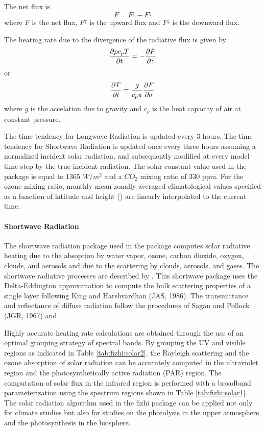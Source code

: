 The net flux is
\[
F = F^\uparrow - F^\downarrow
\]
where $F$ is the net flux, $F^\uparrow$ is the upward flux and $F^\downarrow$ is
the downward flux.

The heating rate due to the divergence of the radiative flux is given by
\[
\frac{\partial \rho c_p T}{\partial t} = - \frac{\partial F}{\partial z}
\]
or
\[
\frac{\partial T}{\partial t} = \frac{g}{c_p \pi} \frac{\partial F}{\partial \sigma}
\]
where $g$ is the accelation due to gravity
and $c_p$ is the heat capacity of air at constant pressure.
  
The time tendency for Longwave
Radiation is updated every 3 hours.  The time tendency for Shortwave Radiation is updated once
every three hours assuming a normalized incident solar radiation, and subsequently modified at
every model time step by the true incident radiation.  
The solar constant value used in the package is equal to 1365 $W/m^2$
and a $CO_2$ mixing ratio of 330 ppm. 
For the ozone mixing ratio, monthly mean zonally averaged 
climatological values specified as a function
of latitude and height (\cite{rosen:87}) are linearly interpolated to the current time.


\paragraph{Shortwave Radiation}

The shortwave radiation package used in the package computes solar radiative 
heating due to the absoption by water vapor, ozone, carbon dioxide, oxygen,
clouds, and aerosols and due to the
scattering by clouds, aerosols, and gases.
The shortwave radiative processes are described by 
\cite{chou:90,chou:92}. This shortwave package
uses the Delta-Eddington approximation to compute the
bulk scattering properties of a single layer following King and Harshvardhan (JAS, 1986).
The transmittance and reflectance of diffuse radiation
follow the procedures of Sagan and Pollock (JGR, 1967) and \cite{lhans:74}.

Highly accurate heating rate calculations are obtained through the use
of an optimal grouping strategy of spectral bands.  By grouping the UV and visible regions
as indicated in Table \ref{tab:fizhi:solar2}, the Rayleigh scattering and the ozone absorption of solar radiation
can be accurately computed in the ultraviolet region and the photosynthetically
active radiation (PAR) region.
The computation of solar flux in the infrared region is performed with a broadband
parameterization using the spectrum regions shown in Table \ref{tab:fizhi:solar1}.
The solar radiation algorithm used in the fizhi package can be applied not only for climate studies but
also for studies on the photolysis in the upper atmosphere and the photosynthesis in the biosphere.

